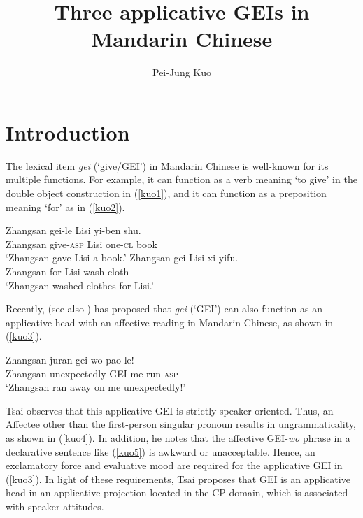 \documentclass[output=paper,colorlinks,citecolor=brown]{langscibook}
\author{Pei-Jung Kuo\affiliation{National Chiayi University}}
\title{Three applicative GEIs in Mandarin Chinese}
\begin{document}
\maketitle

\section{Introduction}\label{sec:kuo:1}
The lexical item \textit{gei} (`give/GEI') in Mandarin Chinese is well-known for its multiple functions. For example, it can function as a verb meaning `to give' in the double object construction in (\ref{kuo1}), and it can function as a preposition meaning `for' as in (\ref{kuo2}).


\ea
\label{kuo1}
\gll Zhangsan   gei-le              Lisi    yi-ben          shu.\\  
     Zhangsan   give-\textsc{asp}   Lisi    one-\textsc{cl} book\\ 
\glt `Zhangsan gave Lisi a book.'
\ex
\label{kuo2}
\gll Zhangsan   gei Lisi    xi      yifu.\\  
     Zhangsan   for Lisi    wash    cloth \\ 
\glt `Zhangsan washed clothes for Lisi.'
\z

Recently, \citet{Tsai2017} (see also \citealt{Tsai2012, Tsai2015b}) has proposed that \textit{gei} (`GEI') can also function as an applicative head with an affective reading in Mandarin Chinese, as shown in (\ref{kuo3}). 

\ea
\label{kuo3}
\gll Zhangsan   juran           gei wo  pao-le!\\  
     Zhangsan   unexpectedly    GEI me  run-\textsc{asp}\\ 
\glt `Zhangsan ran away on me unexpectedly!'
\z

Tsai observes that this applicative GEI is strictly speaker-oriented. Thus, an Affectee other than the first-person singular pronoun results in ungrammaticality, as shown in (\ref{kuo4}). In addition, he notes that the affective GEI-\textit{wo} phrase in a declarative sentence like (\ref{kuo5}) is awkward or unacceptable. Hence, an exclamatory force and evaluative mood are required for the applicative GEI in (\ref{kuo3}). In light of these requirements, Tsai proposes that GEI is an applicative head in an applicative projection located in the CP domain, which is associated with speaker attitudes.

{
\z}
\end{document}
